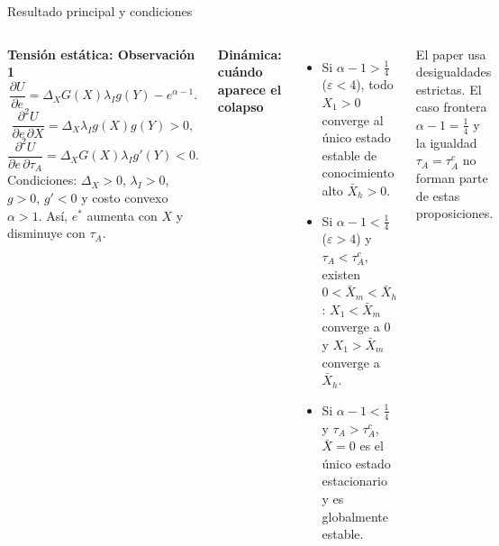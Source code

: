 \documentclass[aspectratio=169,11pt]{beamer}
\newcommand{\azul}[1]{\textcolor{AzulMedio}{\textbf{#1}}}
\begin{document}
\begin{frame}{Resultado principal y condiciones}
\begin{columns}[T,onlytextwidth]
\azul{Tensión estática: Observación 1}
\[
\frac{\partial U}{\partial e}
=\Delta_XG(X)\lambda_I g(Y)-e^{\alpha-1}.
\]
\[
\frac{\partial^2U}{\partial e\,\partial X}
=\Delta_X\lambda_I g(X)g(Y)>0,
\]
\[
\frac{\partial^2U}{\partial e\,\partial\tau_A}
=\Delta_XG(X)\lambda_I g'(Y)<0.
\]
{\small Condiciones: $\Delta_X>0$, $\lambda_I>0$, $g>0$, $g'<0$ y costo convexo $\alpha>1$. Así, $e^*$ aumenta con $X$ y disminuye con $\tau_A$.}

\azul{Dinámica: cuándo aparece el colapso}
\begin{itemize}\small
  \item Si $\alpha-1>\tfrac14$ ($\varepsilon<4$), todo $X_1>0$ converge al único estado estable de conocimiento alto $\bar X_h>0$.
  \item Si $\alpha-1<\tfrac14$ ($\varepsilon>4$) y $\tau_A<\tau_A^c$, existen $0<\bar X_m<\bar X_h$: $X_1<\bar X_m$ converge a $0$ y $X_1>\bar X_m$ converge a $\bar X_h$.
  \item Si $\alpha-1<\tfrac14$ y $\tau_A>\tau_A^c$, $\bar X=0$ es el único estado estacionario y es globalmente estable.
\end{itemize}
\vspace{0.08cm}
{\footnotesize\color{Gris}El paper usa desigualdades estrictas. El caso frontera $\alpha-1=\tfrac14$ y la igualdad $\tau_A=\tau_A^c$ no forman parte de estas proposiciones.}
\end{columns}
\end{frame}
\end{document}

